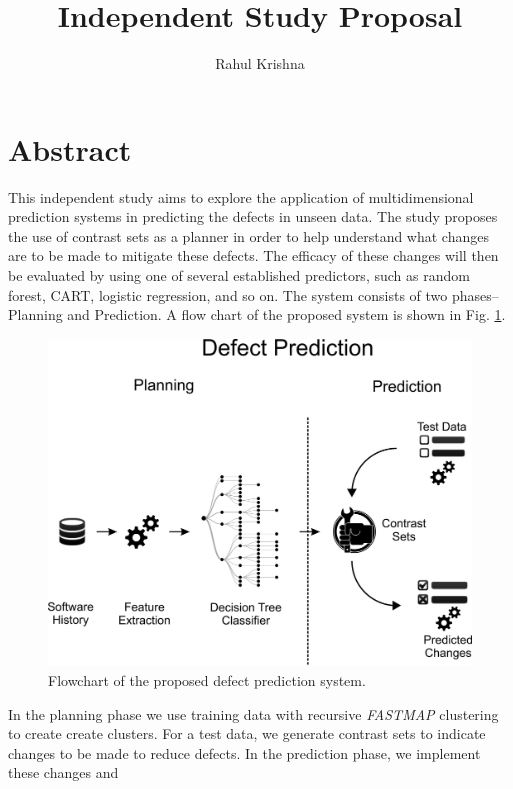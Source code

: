 \documentclass{article}
\begin{document}
\title{Independent Study Proposal}
\author{Rahul Krishna}
\maketitle

\section{Abstract}
This independent study aims to explore the application of multidimensional 
prediction systems in predicting the defects in unseen data. The study proposes 
the use of contrast sets as a planner in order to help understand what changes 
are to be made to mitigate these defects. The efficacy of these changes will 
then be evaluated by using one of several established predictors, such as 
random forest, CART, logistic regression, and so on. The system consists of two 
phases-- Planning and Prediction. A flow chart of the proposed system is shown 
in Fig. \ref{fig1}. 

\begin{figure}[h!]
\centering
\includegraphics[width = 0.7\linewidth]{flowchart}
\caption{Flowchart of the proposed defect prediction system.}
\label{fig1}
\end{figure}

\noindent In the planning phase we use training data with recursive 
\textit{FASTMAP} clustering to create create clusters. For a test data, we 
generate contrast sets to indicate changes to be made to reduce defects. In the 
prediction phase, we implement these changes and 
\end{document}
